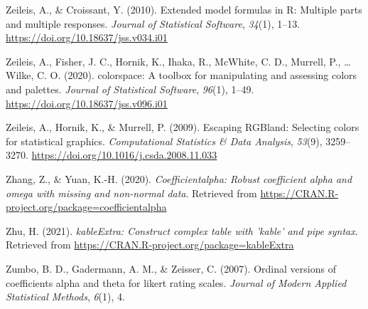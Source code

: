 \documentclass[
  english,
  man]{apa6}
\newlength{\cslhangindent}
\newlength{\cslentryspacingunit} %
\newenvironment{CSLReferences}[2] %
 {%
  \setlength{\parindent}{0pt}
  \ifodd #1
  \let\oldpar\par
  \def\par{\hangindent=\cslhangindent\oldpar}
  \fi
  \setlength{\parskip}{#2\cslentryspacingunit}
 }%
 {}
\begin{document}
\begin{CSLReferences}{1}{0}
\leavevmode{}%
Zeileis, A., \& Croissant, Y. (2010). Extended model formulas in {R}: Multiple parts and multiple responses. \emph{Journal of Statistical Software}, \emph{34}(1), 1--13. \url{https://doi.org/10.18637/jss.v034.i01}

\leavevmode{}%
Zeileis, A., Fisher, J. C., Hornik, K., Ihaka, R., McWhite, C. D., Murrell, P., \ldots{} Wilke, C. O. (2020). {colorspace}: A toolbox for manipulating and assessing colors and palettes. \emph{Journal of Statistical Software}, \emph{96}(1), 1--49. \url{https://doi.org/10.18637/jss.v096.i01}

\leavevmode{}%
Zeileis, A., Hornik, K., \& Murrell, P. (2009). Escaping {RGB}land: Selecting colors for statistical graphics. \emph{Computational Statistics \& Data Analysis}, \emph{53}(9), 3259--3270. \url{https://doi.org/10.1016/j.csda.2008.11.033}

\leavevmode{}%
Zhang, Z., \& Yuan, K.-H. (2020). \emph{Coefficientalpha: Robust coefficient alpha and omega with missing and non-normal data}. Retrieved from \url{https://CRAN.R-project.org/package=coefficientalpha}

\leavevmode{}%
Zhu, H. (2021). \emph{kableExtra: Construct complex table with 'kable' and pipe syntax}. Retrieved from \url{https://CRAN.R-project.org/package=kableExtra}

\leavevmode{}%
Zumbo, B. D., Gadermann, A. M., \& Zeisser, C. (2007). Ordinal versions of coefficients alpha and theta for likert rating scales. \emph{Journal of Modern Applied Statistical Methods}, \emph{6}(1), 4.

\end{CSLReferences}

\endgroup


\clearpage
\makeatletter
\efloat@restorefloats
\makeatother
\end{document}
